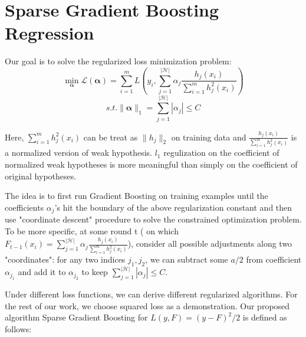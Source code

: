 \documentclass{article} %
\begin{document}
\section{Sparse Gradient Boosting Regression}
Our goal is to solve the regularized loss minimization problem:
\[\min_{\boldsymbol\alpha} \mathcal{L}(\boldsymbol\alpha) = \sum_{i=1}^m L(y_i ,  \sum_{j=1}^{|\mathcal{H}|} \alpha_j \frac {h_j(x_i)}{\sum_{i=1}^{m}h_j^2(x_i)})\]
\[ s.t. \|\boldsymbol\alpha\|_1 = \sum_{j=1}^{|\mathcal{H}|} |\alpha_j|\leq C\]

Here, $\sum_{i=1}^{m}h_j^2(x_i)$ can be treat as $\|h_j\|_2$ on training data and $\frac {h_j(x_i)}{\sum_{i=1}^{m}h_j^2(x_i)}$ is a normalized version of weak hypothesis. $l_1$ regulization on the coefficient of
normalized weak hypotheses is more meaningful than simply on the coefficient of original hypotheses.

The idea is to first run Gradient Boosting on training examples until the coefficients $\alpha_j$'s hit the boundary of the above regularization constant and then use  "coordinate descent" procedure to solve  the constrained optimization problem. To be more specific, at some round t  ( on which $F_{t-1}(x_i)=\sum_{j=1}^{|\mathcal{H}|}\alpha_j \frac{h_j(x_i)}{\sum_{i=1}^{m}h_j^2(x_i)}$), consider all possible adjustments along two "coordinates": for any two indices $j_1, j_2$, we can subtract some $a/2$ from coefficient  $\alpha_{j_1}$ and add it to $\alpha_{j_2}$ to keep $\sum_{j=1}^{|\mathcal{H}|} |\alpha_j|\leq C$.

Under different loss functions, we can derive different regularized algorithms. For the rest of our work, we choose squared loss as a demonstration. Our proposed algorithm Sparse Gradient Boosting for $L(y,F)=(y-F)^2/2$ is defined as follows:
\end{document}
